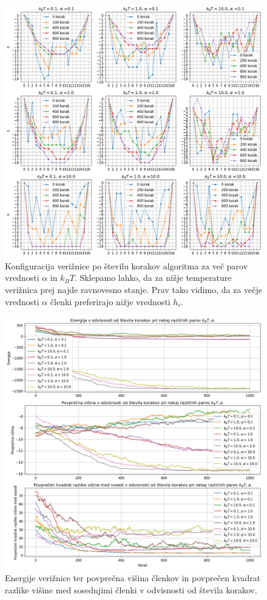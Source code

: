 \documentclass[slovene,11pt,a4paper]{article}
\begin{document}
\begin{figure}[h!]
\centering
\includegraphics[width=\linewidth]{veriznica1.png}
\caption{Konfiguracija verižnice po številu korakov algoritma za več parov vrednosti $\alpha$ in $k_BT$. Sklepamo lahko, da za nižje temperature verižnica prej najde ravnovesno stanje. Prav tako vidimo, da za večje vrednosti $\alpha$ členki preferirajo nižje vrednosti $h_i$.}
\end{figure}

\newpage

\begin{figure}[h!]
\centering
\includegraphics[width=\linewidth]{veriznica2.png}
\caption{Energije verižnice ter povprečna višina členkov in povprečen kvadrat razlike višine med sosednjimi členki v odvisnosti od števila korakov.}
\end{figure}
\end{document}
